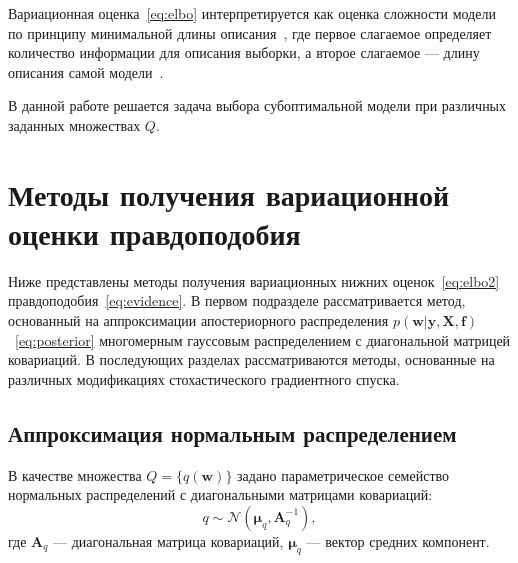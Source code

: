 Вариационная оценка~\eqref{eq:elbo} интерпретируется как оценка сложности модели по принципу минимальной длины описания~\cite{mdl}, где первое слагаемое определяет количество информации для описания выборки, а второе слагаемое --- длину описания самой модели~\cite{nips}.


В данной работе решается задача выбора субоптимальной модели при различных заданных множествах $Q$.

\section{Методы получения вариационной оценки правдоподобия}
Ниже представлены методы получения вариационных нижних оценок~\eqref{eq:elbo2} правдоподобия~\eqref{eq:evidence}. В первом подразделе рассматривается метод, основанный на аппроксимации апостериорного распределения $p( \mathbf{w}|\mathbf{y}, \mathbf{X}, \mathbf{f})$~\eqref{eq:posterior} многомерным гауссовым распределением с диагональной матрицей ковариаций. В последующих разделах рассматриваются методы, основанные на различных модификациях стохастического градиентного спуска. 

\subsection{Аппроксимация нормальным распределением}
В качестве множества $Q = \{q(\mathbf{w})\}$ задано параметрическое семейство нормальных распределений с диагональными матрицами ковариаций:
\begin{equation}
\label{eq:diag}
	q \sim \mathcal{N}(\boldsymbol{\mu}_q, \mathbf{A}^{-1}_q),
\end{equation}
где $\mathbf{A}_q$ --- диагональная матрица ковариаций, $\boldsymbol{\mu}_q$ --- вектор средних компонент.

